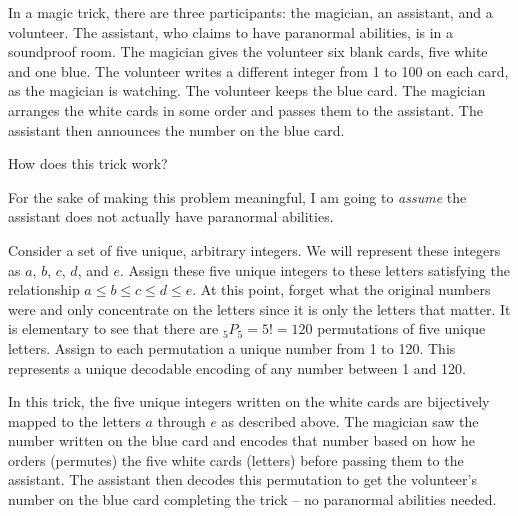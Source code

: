 \newpage
\begin{problem}{15}{5}
  In a magic trick, there are three participants: the magician, an assistant, and a volunteer.  The assistant, who claims to have paranormal abilities, is in a soundproof room.  The magician gives the volunteer six blank cards, five white and one blue.  The volunteer writes a different integer from 1 to 100 on each card, as the magician is watching.  The volunteer keeps the blue card. The magician arranges the white cards in some order and passes them to the assistant. The assistant then announces the number on the blue card.
  
  How does this trick work?
\end{problem}

For the sake of making this problem meaningful, I am going to \textit{assume} the assistant does not actually have paranormal abilities.

Consider a set of five unique, arbitrary integers.  We will represent these integers as $a$, $b$, $c$, $d$, and $e$.  Assign these five unique integers to these letters satisfying the relationship $a \leq b \leq c \leq d \leq e$.  At this point, forget what the original numbers were and only concentrate on the letters since it is only the letters that matter.  It is elementary to see that there are ${}_{5}P_{5} = 5! = 120$ permutations of five unique letters.  Assign to each permutation a unique number from 1 to 120.  This represents a unique decodable encoding of any number between 1 and 120.

In this trick, the five unique integers written on the white cards are bijectively mapped to the letters $a$ through $e$ as described above.  The magician saw the number written on the blue card and encodes that number based on how he orders (permutes) the five white cards (letters) before passing them to the assistant.  The assistant then decodes this permutation to get the volunteer's number on the blue card completing the trick -- no paranormal abilities needed.

